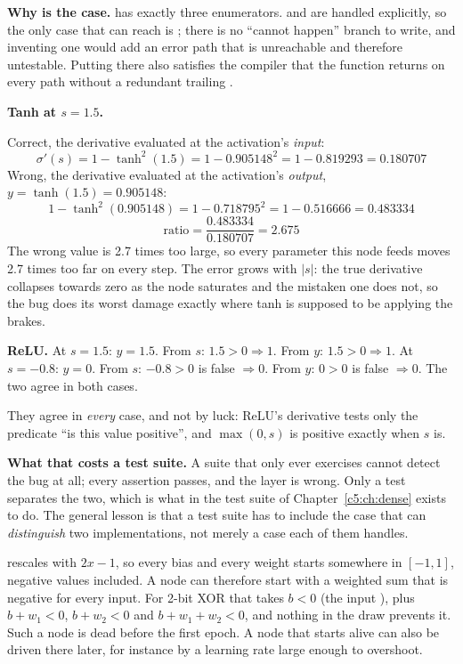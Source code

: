 \textbf{Why  is the  case.}  has exactly three enumerators.
 and  are handled explicitly, so the only case that can reach  is
; there is no ``cannot happen'' branch to write, and inventing one would add an error path
that is unreachable and therefore untestable. Putting  there also satisfies the compiler
that the function returns on every path without a redundant trailing . 

\textbf{Tanh at $s = 1.5$.}

Correct, the derivative evaluated at the activation's \emph{input}:
\[
  \sigma'(s) = 1 - \tanh^2(1.5) = 1 - 0.905148^2 = 1 - 0.819293 = \mathbf{0.180707}
\]
Wrong, the derivative evaluated at the activation's \emph{output}, $y = \tanh(1.5) = 0.905148$:
\[
  1 - \tanh^2(0.905148) = 1 - 0.718795^2 = 1 - 0.516666 = \mathbf{0.483334}
\]
\[
  \text{ratio} = \frac{0.483334}{0.180707} = \mathbf{2.675}
\]
The wrong value is 2.7 times too large, so every parameter this node feeds moves 2.7 times too far on
every step. The error grows with $\lvert s \rvert$: the true derivative collapses towards zero as the
node saturates and the mistaken one does not, so the bug does its worst damage exactly where tanh is
supposed to be applying the brakes. 

\textbf{ReLU.} At $s = 1.5$: $y = 1.5$. From $s$: $1.5 > 0 \Rightarrow 1$. From $y$:
$1.5 > 0 \Rightarrow 1$. At $s = -0.8$: $y = 0$. From $s$: $-0.8 > 0$ is false $\Rightarrow 0$. From
$y$: $0 > 0$ is false $\Rightarrow 0$. The two agree in both cases.

They agree in \emph{every} case, and not by luck: ReLU's derivative tests only the predicate ``is
this value positive'', and $\max(0, s)$ is positive exactly when $s$ is. 

\textbf{What that costs a test suite.} A suite that only ever exercises  cannot detect the
bug at all; every assertion passes, and the layer is wrong. Only a  test separates the
two, which is what  in the test suite of
Chapter~\ref{c5:ch:dense} exists to do. The general lesson is that a test suite has to include the
case that can \emph{distinguish} two implementations, not merely a case each of them handles.

 rescales  with $2x - 1$, so every bias and
every weight starts somewhere in $[-1, 1]$, negative values included. A node can therefore start
with a weighted sum that is negative for every input. For 2-bit XOR that takes $b < 0$ (the input
), plus $b + w_1 < 0$, $b + w_2 < 0$ and $b + w_1 + w_2 < 0$, and nothing in the draw
prevents it. Such a node is dead before the first epoch. A node that starts alive can also be
driven there later, for instance by a learning rate large enough to overshoot. 

